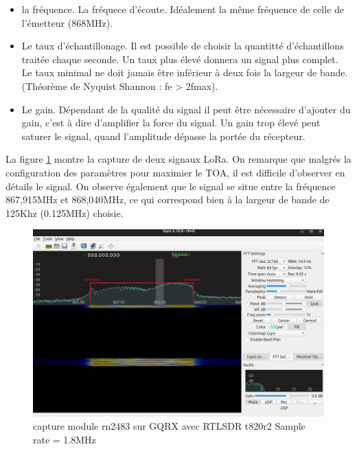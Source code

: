 \begin{itemize}
\item la fréquence. La fréquece d'écoute. Idéalement la même fréquence de celle de l'émetteur (868MHz).
\item Le taux d'échantillonage. Il est possible de choisir la quantitté d'échantillons traitée chaque seconde. Un taux plus élevé donnera un signal plus complet. Le taux minimal ne doit jamais être inférieur à deux fois la largeur de bande. (Théorème de Nyquist Shannon : fe > 2fmax).
\item Le gain. Dépendant de la qualité du signal il peut être nécessaire d'ajouter du gain, c'est à dire d'amplifier la force du signal. Un gain trop élevé peut saturer le signal, quand l'amplitude dépasse la portée du récepteur.
\end{itemize}

La figure \ref{term301} montre la capture de deux signaux LoRa. On remarque que malgrés la configuration des paramètres pour maximier le TOA, il est difficile d'observer en détails le signal. On observe également que le signal se situe entre la fréquence 867,915MHz et 868,040MHz, ce qui correspond bien à la largeur de bande de 125Khz (0.125MHz) choisie.

\begin{figure}[h]
\centering

\includegraphics[scale=0.25]{images/gqrx4.png}
\caption{capture module rn2483 sur GQRX avec RTLSDR t820r2 Sample rate = 1.8MHz}\label{term301}
\end{figure}

